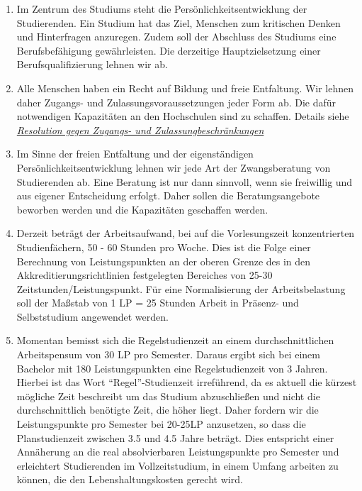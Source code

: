 \begin{enumerate}
\def\labelenumi{(\arabic{enumi})}
\item
  Im Zentrum des Studiums steht die Persönlichkeitsentwicklung der
  Studierenden. Ein Studium hat das Ziel, Menschen zum kritischen Denken
  und Hinterfragen anzuregen. Zudem soll der Abschluss des Studiums eine
  Berufsbefähigung gewährleisten. Die derzeitige Hauptzielsetzung einer
  Berufsqualifizierung lehnen wir ab.
\item
  Alle Menschen haben ein Recht auf Bildung und freie Entfaltung. Wir
  lehnen daher Zugangs- und Zulassungsvoraussetzungen jeder Form ab. Die
  dafür notwendigen Kapazitäten an den Hochschulen sind zu schaffen.
  Details siehe
  \href{https://zapfev.de/resolutionen/wise16/Zugangs-Zulassungsbeschraenkung/Reso\%20gegen\%20Zugangs-\%20und\%20Zulassungsbeschraenkungen.pdf}{\emph{Resolution
  gegen Zugangs- und Zulassungbeschränkungen}}
\item
  Im Sinne der freien Entfaltung und der eigenständigen
  Persönlichkeitsentwicklung lehnen wir jede Art der Zwangsberatung von
  Studierenden ab. Eine Beratung ist nur dann sinnvoll, wenn sie
  freiwillig und aus eigener Entscheidung erfolgt. Daher sollen die
  Beratungsangebote beworben werden und die Kapazitäten geschaffen
  werden.
\item
  Derzeit beträgt der Arbeitsaufwand, bei auf die Vorlesungszeit
  konzentrierten Studienfächern, 50 - 60 Stunden pro Woche. Dies ist die
  Folge einer Berechnung von Leistungspunkten an der oberen Grenze des
  in den Akkreditierungsrichtlinien festgelegten Bereiches von 25-30
  Zeitstunden/Leistungspunkt. Für eine Normalisierung der
  Arbeitsbelastung soll der Maßstab von 1 LP = 25 Stunden Arbeit in
  Präsenz- und Selbststudium angewendet werden.
\item
  Momentan bemisst sich die Regelstudienzeit an einem durchschnittlichen
  Arbeitspensum von 30 LP pro Semester. Daraus ergibt sich bei einem
  Bachelor mit 180 Leistungspunkten eine Regelstudienzeit von 3 Jahren.
  Hierbei ist das Wort ``Regel''-Studienzeit irreführend, da es aktuell
  die kürzest mögliche Zeit beschreibt um das Studium abzuschließen und
  nicht die durchschnittlich benötigte Zeit, die höher liegt. Daher
  fordern wir die Leistungspunkte pro Semester bei 20-25LP anzusetzen,
  so dass die Planstudienzeit zwischen 3.5 und 4.5 Jahre beträgt. Dies
  entspricht einer Annäherung an die real absolvierbaren Leistungspunkte
  pro Semester und erleichtert Studierenden im Vollzeitstudium, in einem
  Umfang arbeiten zu können, die den Lebenshaltungskosten gerecht wird.

\end{enumerate}
